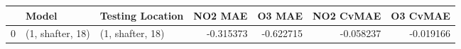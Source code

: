 \begin{tabular}{lllrrrr}
\toprule
{} &             Model &  Testing Location &   NO2 MAE &    O3 MAE &  NO2 CvMAE &  O3 CvMAE \\
\midrule
0 &  (1, shafter, 18) &  (1, shafter, 18) & -0.315373 & -0.622715 &  -0.058237 & -0.019166 \\
\bottomrule
\end{tabular}
